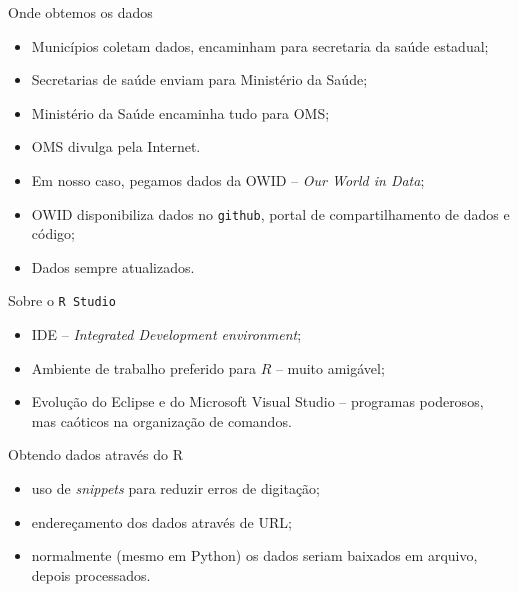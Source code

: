 \documentclass[a4paper,10pt]{beamer}
\begin{document}
\begin{frame}{Onde obtemos os dados}
  \begin{itemize}
      \item Municípios coletam dados, encaminham para secretaria da saúde 
	  estadual;
      \item Secretarias de saúde enviam para Ministério da Saúde;
      \item Ministério da Saúde encaminha tudo para OMS;
      \item OMS divulga pela Internet.
      \item Em nosso caso, pegamos dados da OWID -- {\em Our World in Data}; 
      \item OWID disponibiliza dados no {\tt github}, portal de compartilhamento
	  de dados e código;
      \item Dados sempre atualizados.
  \end{itemize}

\end{frame}

\begin{frame}{Sobre o {\tt R Studio}}
  \begin{itemize}
      \item IDE -- {\em Integrated Development environment};
      \item Ambiente de trabalho preferido para $R$ -- muito amigável;
      \item Evolução do Eclipse e do Microsoft Visual Studio -- programas 
	  poderosos, mas caóticos na organização de comandos.
  \end{itemize}

\end{frame}

\begin{frame}[fragile]{ Obtendo dados através do R}

  
  \begin{itemize}
      \item uso de {\em snippets} para reduzir erros de digitação;
      \item endereçamento dos dados através de URL;
      \item normalmente (mesmo em Python) os dados seriam baixados em arquivo,
	  depois processados.
  \end{itemize}

\end{frame}
\end{document}
